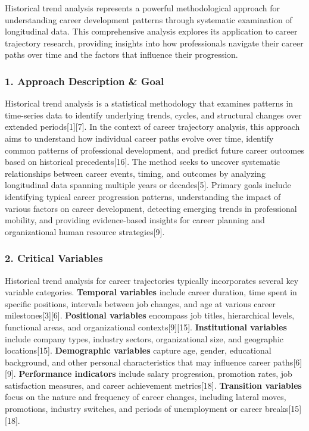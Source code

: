 \documentclass[./main.tex]{subfiles}
\begin{document}
Historical trend analysis represents a powerful methodological approach
for understanding career development patterns through systematic
examination of longitudinal data. This comprehensive analysis explores
its application to career trajectory research, providing insights into
how professionals navigate their career paths over time and the factors
that influence their progression.

\subsubsection{1. Approach Description \&
Goal}\label{approach-description-goal}

Historical trend analysis is a statistical methodology that examines
patterns in time-series data to identify underlying trends, cycles, and
structural changes over extended periods{[}1{]}{[}7{]}. In the context
of career trajectory analysis, this approach aims to understand how
individual career paths evolve over time, identify common patterns of
professional development, and predict future career outcomes based on
historical precedents{[}16{]}. The method seeks to uncover systematic
relationships between career events, timing, and outcomes by analyzing
longitudinal data spanning multiple years or decades{[}5{]}. Primary
goals include identifying typical career progression patterns,
understanding the impact of various factors on career development,
detecting emerging trends in professional mobility, and providing
evidence-based insights for career planning and organizational human
resource strategies{[}9{]}.

\subsubsection{2. Critical Variables}\label{critical-variables}

Historical trend analysis for career trajectories typically incorporates
several key variable categories. \textbf{Temporal variables} include
career duration, time spent in specific positions, intervals between job
changes, and age at various career milestones{[}3{]}{[}6{]}.
\textbf{Positional variables} encompass job titles, hierarchical levels,
functional areas, and organizational contexts{[}9{]}{[}15{]}.
\textbf{Institutional variables} include company types, industry
sectors, organizational size, and geographic locations{[}15{]}.
\textbf{Demographic variables} capture age, gender, educational
background, and other personal characteristics that may influence career
paths{[}6{]}{[}9{]}. \textbf{Performance indicators} include salary
progression, promotion rates, job satisfaction measures, and career
achievement metrics{[}18{]}. \textbf{Transition variables} focus on the
nature and frequency of career changes, including lateral moves,
promotions, industry switches, and periods of unemployment or career
breaks{[}15{]}{[}18{]}.
\end{document}
